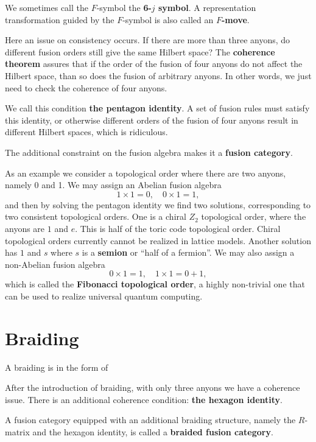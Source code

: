 \documentclass[hyperref, a4paper]{article}
\newcommand*{\concept}[1]{{\textbf{#1}}}
\def\mathbb#1{#1}%
\begin{document}

We sometimes call the $F$-symbol the \concept{6-$j$ symbol}. A representation transformation guided by the $F$-symbol is also called an \concept{$F$-move}.

Here an issue on consistency occurs. If there are more than three anyons, do different fusion orders still give the same Hilbert space?
The \concept{coherence theorem} assures that if the order of the fusion of four anyons do not affect the Hilbert space, than so does the fusion of arbitrary anyons.
In other words, we just need to check the coherence of four anyons.

We call this condition \concept{the pentagon identity}. 
A set of fusion rules must satisfy this identity, or otherwise different orders of the fusion of four anyons result in different Hilbert spaces, which is ridiculous.

The additional constraint on the fusion algebra makes it a \concept{fusion category}.

As an example we consider a topological order where there are two anyons, namely 0 and 1.
We may assign an Abelian fusion algebra
\begin{equation}
    1 \times 1 = 0, \quad 0 \times 1 = 1,
\end{equation}
and then by solving the pentagon identity we find two solutions, corresponding to two consistent topological orders.
One is a chiral $\mathbb{Z}_2$ topological order, where the anyons are $1$ and $e$.
This is half of the toric code topological order. Chiral topological orders currently cannot be realized in lattice models.
Another solution has $1$ and $s$ where $s$ is a \concept{semion} or ``half of a fermion''.
We may also assign a non-Abelian fusion algebra 
\begin{equation}
    0 \times 1 = 1, \quad 1 \times 1 = 0 + 1,
\end{equation}
which is called the \concept{Fibonacci topological order}, a highly non-trivial one that can be used to realize universal quantum computing.

\section{Braiding}

A braiding is in the form of 

After the introduction of braiding, with only three anyons we have a coherence issue. There is an additional coherence condition: \concept{the hexagon identity}.

A fusion category equipped with an additional braiding structure, namely the $R$-matrix and the hexagon identity, is called a \concept{braided fusion category}.
\end{document}
